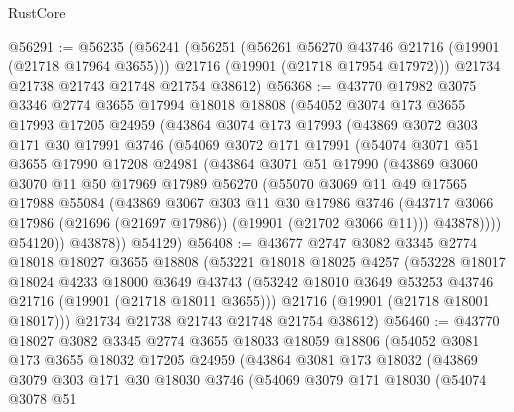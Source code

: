 \begin{lexlean}{RustCore}
\begin{coremodule}
@56291 := @56235
    (@56241
      (@56251
        (@56261 @56270 @43746 @21716 (@19901 (@21718 @17964 @3655)))
        @21716
        (@19901 (@21718 @17954 @17972)))
      @21734
      @21738
      @21743
      @21748
      @21754
      @38612)
@56368 := @43770
    @17982
    @3075
    @3346
    @2774
    @3655
    @17994
    @18018
    @18808
    (@54052
      @3074
      @173
      @3655
      @17993
      @17205
      @24959
      (@43864
        @3074
        @173
        @17993
        (@43869
          @3072
          @303
          @171
          @30
          @17991
          @3746
          (@54069
            @3072
            @171
            @17991
            (@54074
              @3071
              @51
              @3655
              @17990
              @17208
              @24981
              (@43864
                @3071
                @51
                @17990
                (@43869
                  @3060
                  @3070
                  @11
                  @50
                  @17969
                  @17989
                  @56270
                  (@55070
                    @3069
                    @11
                    @49
                    @17565
                    @17988
                    @55084
                    (@43869
                      @3067
                      @303
                      @11
                      @30
                      @17986
                      @3746
                      (@43717 @3066 @17986 (@21696 (@21697 @17986)) (@19901 (@21702 @3066 @11)))
                      @43878))))
              @54120))
          @43878))
      @54129)
@56408 := @43677
    @2747
    @3082
    @3345
    @2774
    @18018
    @18027
    @3655
    @18808
    (@53221
      @18018
      @18025
      @4257
      (@53228
        @18017
        @18024
        @4233
        @18000
        @3649
        @43743
        (@53242 @18010 @3649 @53253 @43746 @21716 (@19901 (@21718 @18011 @3655)))
        @21716
        (@19901 (@21718 @18001 @18017)))
      @21734
      @21738
      @21743
      @21748
      @21754
      @38612)
@56460 := @43770
    @18027
    @3082
    @3345
    @2774
    @3655
    @18033
    @18059
    @18806
    (@54052
      @3081
      @173
      @3655
      @18032
      @17205
      @24959
      (@43864
        @3081
        @173
        @18032
        (@43869
          @3079
          @303
          @171
          @30
          @18030
          @3746
          (@54069
            @3079
            @171
            @18030
            (@54074
              @3078
              @51

\end{coremodule}
\end{lexlean}
